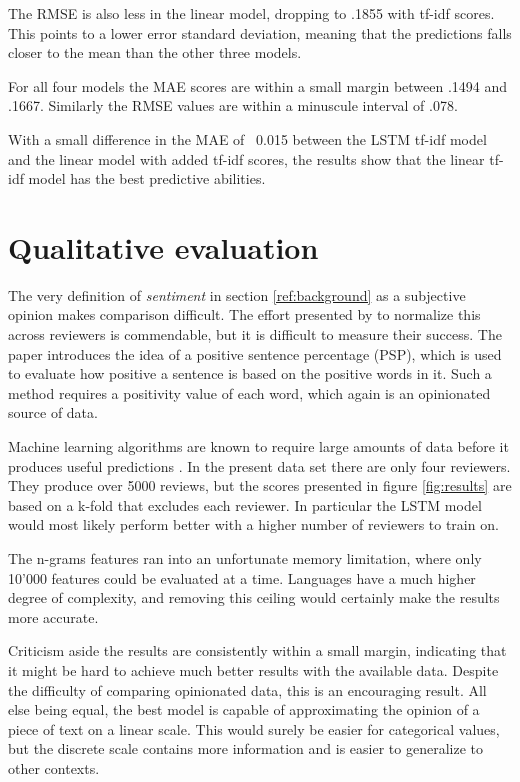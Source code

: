 \documentclass[a4paper]{article}
\begin{document}
The RMSE is also less in the linear model, dropping to .1855 with tf-idf scores.
This points to a lower error standard deviation, meaning that the predictions
falls closer to the mean than the other three models.

For all four models the MAE scores are within a small margin between .1494 and
.1667. Similarly the RMSE values are within a minuscule interval of .078.

With a small difference in the MAE of ~0.015 between the LSTM tf-idf model and
the linear model with added tf-idf scores, the results show that the linear
tf-idf model has the best predictive abilities.

\section{Qualitative evaluation}
The very definition of \textit{sentiment} in section \ref{ref:background} as
a subjective opinion makes comparison difficult. The effort presented by
\cite{PangLee2005} to normalize this across reviewers is commendable, but it
is difficult to measure their success. The paper introduces the idea of a positive
sentence percentage (PSP), which is used to evaluate how positive a sentence
is based on the positive words in it. Such a method requires a positivity value
of each word, which again is an opinionated source of data.

Machine learning algorithms are known to require large amounts of data before
it produces useful predictions \citep{Schmidhuber2015, Russell2009}. In the
present data set there are only four reviewers. They produce over 5000 reviews,
but the scores presented in figure \ref{fig:results} are based on a k-fold that
excludes each reviewer. In particular the LSTM model would most likely perform
better with a higher number of reviewers to train on.

The n-grams features ran into an unfortunate memory limitation, where only
10'000 features could be evaluated at a time. Languages have a much higher
degree of complexity, and removing this ceiling would certainly make the results
more accurate.

Criticism aside the results are consistently within a small margin, indicating
that it might be hard to achieve much better results with the available data.
Despite the difficulty of comparing opinionated data, this is an encouraging
result. All else being equal, the best model is capable of approximating
the opinion of a piece of text on a linear scale. This would surely be easier
for categorical values, but the discrete scale contains more information and
is easier to generalize to other contexts.
\end{document}

